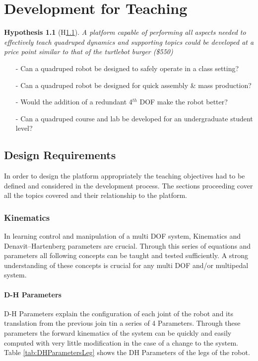 \documentclass[12pt]{report}
\newtheorem{hyp}{Hypothesis}
\begin{document}
\chapter{Development for Teaching}
\begin{hyp}[H\ref{hyp:first}] \label{hyp:first}
A platform capable of performing all aspects needed to effectively teach quadruped dynamics and supporting topics could be developed at a price point similar to that of the turtlebot burger (\$550)
\end{hyp}
\begin{itemize}
    \item[-] Can a quadruped robot be designed to safely operate in a class setting?
    \item[-] Can a quadruped robot be designed for quick assembly \& mass production?
    \item[-] Would the addition of a redundant 4$^{th}$ DOF make the robot better?
    \item[-] Can a quadruped course and lab be developed for an undergraduate student level?
\end{itemize}
\section{Design Requirements}\label{sec:DesignReqs}
    In order to design the platform appropriately the teaching objectives had to be defined and considered in the development process. The sections proceeding cover all the topics covered and their relationship to the platform.
    \subsection{Kinematics}
        In learning control and manipulation of a multi DOF system, Kinematics and Denavit–Hartenberg parameters are crucial. Through this series of equations and parameters all following concepts can be taught and tested sufficiently. A strong understanding of these concepts is crucial for any multi DOF and/or multipedal system.
        \subsubsection{D-H Parameters}\label{DH-Params}
            D-H Parameters explain the configuration of each joint of the robot and its translation from the previous join tin a series of 4 Parameters. Through these parameters the forward kinematics of the system can be quickly and easily computed with very little modification in the case of a change to the system. Table \ref{tab:DHParametersLeg} shows the DH Parameters of the legs of the robot.
            
\end{document}
